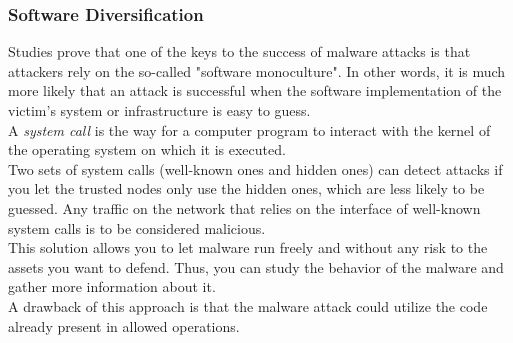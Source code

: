 \subsubsection{Software Diversification}
Studies prove that one of the keys to the success of malware attacks is that attackers rely on the so-called "software monoculture". In other words, it is much more likely that an attack is successful when the software implementation of the victim's system or infrastructure is easy to guess.\\
A \textit{system call} is the way for a computer program to interact with the kernel of the operating system on which it is executed.\\
Two sets of system calls (well-known ones and hidden ones) can detect attacks if you let the trusted nodes only use the hidden ones, which are less likely to be guessed. Any traffic on the network that relies on the interface of well-known system calls is to be considered malicious.\\
This solution allows you to let malware run freely and without any risk to the assets you want to defend. Thus, you can study the behavior of the malware and gather more information about it.\\
A drawback of this approach is that the malware attack could utilize the code already present in allowed operations.


